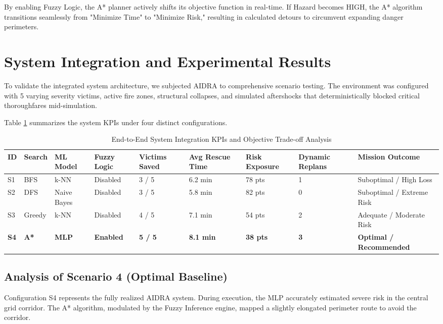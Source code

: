 \documentclass[conference]{IEEEtran}
\begin{document}
By enabling Fuzzy Logic, the A* planner actively shifts its objective function in real-time. If Hazard becomes HIGH, the A* algorithm transitions seamlessly from "Minimize Time" to "Minimize Risk," resulting in calculated detours to circumvent expanding danger perimeters.

\section{System Integration and Experimental Results}

To validate the integrated system architecture, we subjected AIDRA to comprehensive scenario testing. The environment was configured with 5 varying severity victims, active fire zones, structural collapses, and simulated aftershocks that deterministically blocked critical thoroughfares mid-simulation. 

Table \ref{tab:system_scenarios} summarizes the system KPIs under four distinct configurations. 

\begin{table}[htbp]
\caption{End-to-End System Integration KPIs and Objective Trade-off Analysis}
\label{tab:system_scenarios}
\centering
\renewcommand{\arraystretch}{1.3}
\begin{tabularx}{\textwidth}{@{}lXXXXXXXX@{}}
\toprule
\textbf{ID} & \textbf{Search} & \textbf{ML Model} & \textbf{Fuzzy Logic} & \textbf{Victims Saved} & \textbf{Avg Rescue Time} & \textbf{Risk Exposure} & \textbf{Dynamic Replans} & \textbf{Mission Outcome} \\ \midrule
S1 & BFS & k-NN & Disabled & 3 / 5 & 6.2 min & 78 pts & 1 & Suboptimal / High Loss \\
S2 & DFS & Naive Bayes & Disabled & 3 / 5 & 5.8 min & 82 pts & 0 & Suboptimal / Extreme Risk \\
S3 & Greedy & k-NN & Disabled & 4 / 5 & 7.1 min & 54 pts & 2 & Adequate / Moderate Risk \\
\textbf{S4} & \textbf{A*} & \textbf{MLP} & \textbf{Enabled} & \textbf{5 / 5} & \textbf{8.1 min} & \textbf{38 pts} & \textbf{3} & \textbf{Optimal / Recommended} \\ \bottomrule
\end{tabularx}
\end{table}

\subsection{Analysis of Scenario 4 (Optimal Baseline)}
Configuration S4 represents the fully realized AIDRA system. During execution, the MLP accurately estimated severe risk in the central grid corridor. The A* algorithm, modulated by the Fuzzy Inference engine, mapped a slightly elongated perimeter route to avoid the corridor. 
\end{document}
